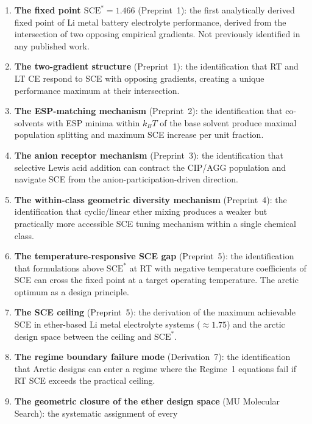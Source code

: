 \documentclass[11pt]{article}
\theoremstyle{plain}
\theoremstyle{definition}
\theoremstyle{remark}
\begin{document}
\begin{enumerate}[leftmargin=2em]
  \item \textbf{The fixed point $\mathrm{SCE}^{*} = 1.466$}
        (Preprint~1): the first analytically derived fixed
        point of Li metal battery electrolyte performance,
        derived from the intersection of two opposing empirical
        gradients.  Not previously identified in any published
        work.
  \item \textbf{The two-gradient structure} (Preprint~1):
        the identification that RT and LT CE respond to SCE
        with opposing gradients, creating a unique performance
        maximum at their intersection.
  \item \textbf{The ESP-matching mechanism} (Preprint~2):
        the identification that co-solvents with ESP minima
        within $k_BT$ of the base solvent produce maximal
        population splitting and maximum SCE increase per
        unit fraction.
  \item \textbf{The anion receptor mechanism} (Preprint~3):
        the identification that selective Lewis acid addition
        can contract the CIP/AGG population and navigate SCE
        from the anion-participation-driven direction.
  \item \textbf{The within-class geometric diversity mechanism}
        (Preprint~4): the identification that cyclic/linear
        ether mixing produces a weaker but practically more
        accessible SCE tuning mechanism within a single chemical
        class.
  \item \textbf{The temperature-responsive SCE gap} (Preprint~5):
        the identification that formulations above $\mathrm{SCE}^{*}$
        at RT with negative temperature coefficients of SCE
        can cross the fixed point at a target operating
        temperature.  The arctic optimum as a design principle.
  \item \textbf{The SCE ceiling} (Preprint~5): the derivation of
        the maximum achievable SCE in ether-based Li metal
        electrolyte systems ($\approx 1.75$) and the arctic
        design space between the ceiling and $\mathrm{SCE}^{*}$.
  \item \textbf{The regime boundary failure mode} (Derivation~7):
        the identification that Arctic designs can enter a
        regime where the Regime~1 equations fail if RT SCE
        exceeds the practical ceiling.
  \item \textbf{The geometric closure of the ether design space}
        (MU Molecular Search): the systematic assignment of every

\end{enumerate}
\end{document}
